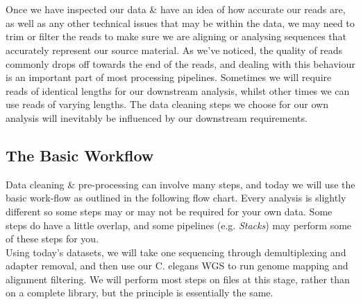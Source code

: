 
\chapter{\moduleTitle}
\newpage


Once we have inspected our data \& have an idea of how accurate our reads are, as well as any other technical issues that may be within the data, we may need to trim or filter the reads to make sure we are aligning or analysing sequences that accurately represent our source material.
As we've noticed, the quality of reads commonly drops off towards the end of the reads, and dealing with this behaviour is an important part of most processing pipelines.
Sometimes we will require reads of identical lengths for our downstream analysis, whilst other times we can use reads of varying lengths.
The data cleaning steps we choose for our own analysis will inevitably be influenced by our downstream requirements.

\section{The Basic Workflow}

Data cleaning \& pre-processing can involve many steps, and today we will use the basic work-flow as outlined in the following flow chart.
Every analysis is slightly different so some steps may or may not be required for your own data.
Some steps do have a little overlap, and some pipelines (e.g. \textit{Stacks}) may perform some of these steps for you.\\

Using today's datasets, we will take one sequencing through demultiplexing and adapter removal, and then use our C. elegans WGS to run genome mapping and alignment filtering.
We will perform most steps on files at this stage, rather than on a complete library, but the principle is essentially the same.\\

